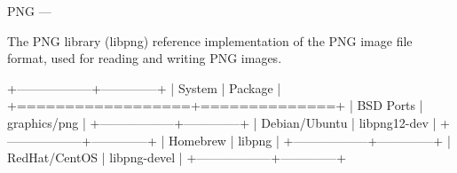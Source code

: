 PNG
---

The PNG library (libpng) reference implementation of the PNG image
file format, used for reading and writing PNG images.

+------------------+--------------+
| System           | Package      |
+==================+==============+
| BSD Ports        | graphics/png |
+------------------+--------------+
| Debian/Ubuntu    | libpng12-dev |
+------------------+--------------+
| Homebrew         | libpng       |
+------------------+--------------+
| RedHat/CentOS    | libpng-devel |
+------------------+--------------+
